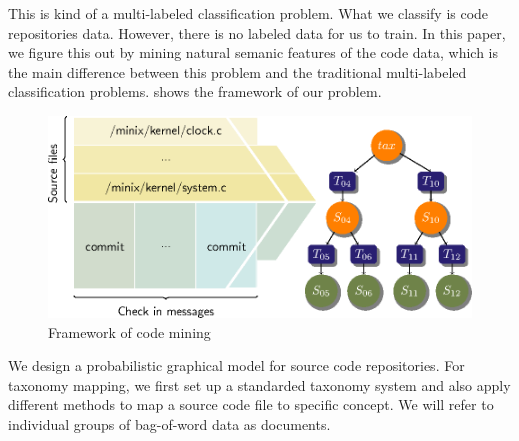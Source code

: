 This is kind of a multi-labeled classification problem. What we classify is code
repositories data. However, there is no labeled data for us to train. In this paper,
we figure this out by mining natural semanic features of the code data, which is the
main difference between this problem and the traditional multi-labeled classification problems.
 shows the framework of our problem.
\begin{figure}[h]
\begin{center}
\includegraphics[width=\columnwidth]{figure/framework.eps}
\caption{Framework of code mining}
\label{fig:fram}
\end{center}
\end{figure}

We design a probabilistic graphical model for source code repositories. 
For taxonomy mapping,  we first set up a standarded taxonomy system and also apply different methods 
 to map a source code file to specific concept. We will refer to individual groups 
 of bag-of-word data as documents. 

